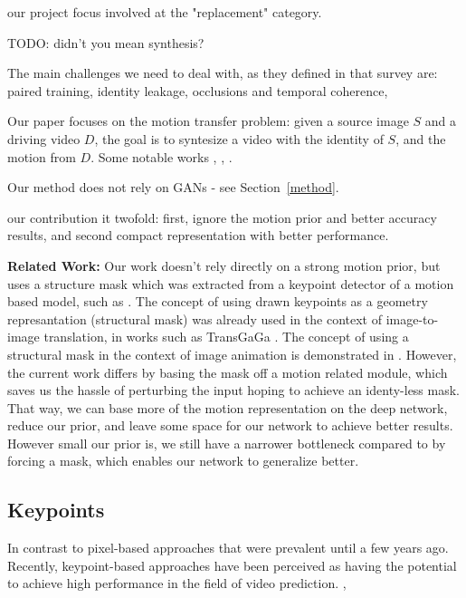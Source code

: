 \documentclass{article}
\begin{document}
our project focus involved at the "replacement" category.

TODO: didn't you mean synthesis?

The main challenges we need to deal with, as they defined in that survey are: paired training, identity leakage, occlusions and temporal coherence,



Our paper focuses on the motion transfer problem: given a source image $S$
and a driving video $D$, the goal is to syntesize a video with the identity
of $S$, and the motion from $D$.
Some notable works \cite{siarohin2020order}, \cite{wiles2018x2face},
\cite{siarohin2019animating}.

Our method does not rely on GANs - see Section~\ref{method}.

our contribution it twofold: first, ignore the motion prior and better accuracy results, and second compact representation with better performance.

\medskip

\textbf{Related Work:} Our work doesn't rely directly on a strong motion prior,
but uses a structure mask which was extracted from a keypoint detector
of a motion based model, such as \cite{siarohin2020order}. The concept of using drawn keypoints as
a geometry represantation (structural mask) was already used in the context
of image-to-image translation, in works such as TransGaGa \cite{wu2019transgaga}.
The concept of using a structural mask in the context of image animation is
demonstrated in \cite{shalev2020image}. However, the current work differs
by basing the mask off a motion related module, which saves us the hassle
of perturbing the input hoping to achieve an identy-less mask. That way, we
can base more of the motion representation on the deep network, reduce our
prior, and leave some space for our network to achieve better results.
However small our prior is, we still have a narrower bottleneck
compared to \cite{wiles2018x2face} by forcing a mask, which enables our
network to generalize better.


\subsection{Keypoints}
In contrast to pixel-based approaches that were prevalent until a few years ago.
Recently, keypoint-based approaches have been perceived as having the
potential to achieve high performance in the field of video prediction.
\cite{kim2019unsupervised}, \cite{balakrishnan2018synthesizing}
\cite{ma2017pose}  \cite{reed2017parallel} \cite{chan2019everybody}
\cite{villegas2017learning}
\cite{cai2018deep}
\cite{wang2018every}
\cite{reed2015deep}
\end{document}
